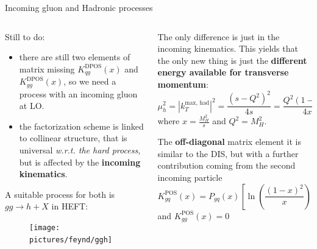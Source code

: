 \documentclass[8pt]{beamer}
\DeclareMathOperator{\pos}{POS}
\DeclareMathOperator{\dpos}{DPOS}
\begin{document}
\begin{frame}{Incoming gluon and Hadronic processes}
    \begin{columns}
        \begin{column}{0.5\textwidth}
            Still to do:
            \begin{itemize}
                \item there are still two elements of matrix missing
                    $K_{qg}^{\dpos}(x)$ and $K_{gg}^{\dpos}(x)$, so we need a
                    process with an incoming gluon at LO.

                \item the factorization scheme is linked to collinear
                    structure, that is universal \textit{w.r.t. the hard
                    process}, but is affected by the \textbf{incoming
                kinematics}.
            \end{itemize}

            \vspace*{8pt}
            A suitable process for both is $gg\to h + X$ in HEFT:
            \begin{figure}
              \texttt{[image: pictures/feynd/ggh]}
            \end{figure}
        \end{column}
        \begin{column}{0.5\textwidth}
            The only difference is just in the incoming kinematics\footnotemark.
            This yields that the only new thing is just the \textbf{different energy available
            for transverse momentum}:
            \begin{equation*}\label{eq:ktmaxh}
                \mu_h^2=  |k_T^\text{max, had}|^2=\frac{(s-Q^2)^2}{4s}=\frac{Q^2(1-x)^2}{4x}
            \end{equation*}
            where $x=\frac{M_H^2}{s}$ and $ Q^2 = M_H^2 $.

            \vspace*{10pt}
            The \textbf{off-diagonal} matrix element it is similar to the DIS, but
            with a further contribution coming from the second incoming particle
            \begin{equation*}
                K_{gq}^{\pos} (x) =
                P_{gq}(x)\left[\ln\left(\frac{(1-x)^2}{x}\right) - 1\right]
            \end{equation*}
            and $K_{gg}^{\pos} (x) = 0$
        \end{column}
    \end{columns}


\end{frame}
\end{document}
